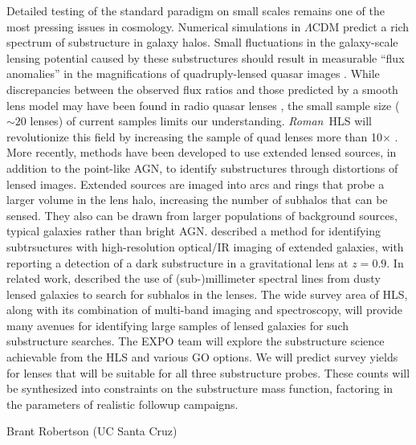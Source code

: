 \documentclass[11pt]{article}
\newcommand{\RST}{\emph{Roman}~}
\begin{document}
Detailed testing of the standard paradigm on small scales remains one of the most pressing issues
in cosmology. Numerical simulations in $\Lambda$CDM predict a rich spectrum of substructure in galaxy
halos. Small fluctuations in the galaxy-scale lensing potential caused by these substructures
should result in measurable “flux anomalies” in the magnifications of quadruply-lensed quasar
images \citep{metcalf2001a}. While discrepancies between the observed flux ratios and
those predicted by a smooth lens model may have been found in radio quasar lenses \citep{mao1998a,dalal2002a,metcalf2002a}, the small sample size ($\sim20$
lenses) of current samples limits our understanding. \RST HLS will revolutionize this field
by increasing the sample of quad lenses more than 10$\times$ \citep{oguri2010a}.
More recently, methods have been developed to use extended lensed sources, in addition to the
point-like AGN, to identify substructures through distortions of lensed images. Extended sources
are imaged into arcs and rings that probe a larger volume in the lens halo, increasing the number
of subhalos that can be sensed. They also can be drawn from larger populations of background
sources, typical galaxies rather than bright AGN. \cite[Vegetti \& Koopman (2009)][]{vegetti2009a} described a
method for identifying subtrsuctures with high-resolution optical/IR imaging of extended
galaxies, with \cite[Vegetti et al. (2012)][]{vegetti2012a} reporting a detection of a dark substructure in a gravitational
lens at $z=0.9$. In related work, \cite[Hezaveh et al. (2013, 2016a)][]{hezaveh2013a,hezaveh2016a} described the use of (sub-)millimeter
spectral lines from dusty lensed galaxies to search for subhalos in the lenses. The wide survey
area of HLS, along with its combination of multi-band imaging and spectroscopy, will provide
many avenues for identifying large samples of lensed galaxies for such substructure searches.
The EXPO team will explore the substructure science achievable from the HLS and various GO
options. We will predict survey yields for lenses that will be suitable for all three substructure
probes. These counts will be synthesized into constraints on the substructure mass function,
factoring in the parameters of realistic followup campaigns.
\clearpage

\noindent %


\def\apj{\it{ApJ}}                  
\def\apjl{\it{ApJL}}
\def\mnras{\it{MNRAS}}
\def\nat{\it{Nature}}




\vspace{4in}


Brant Robertson (UC Santa Cruz)
\end{document}
